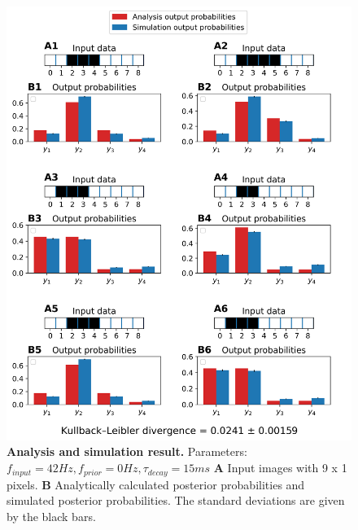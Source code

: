 \begin{figure}
  \includegraphics[width=\linewidth]{figures/1D/1D_42_0_15.png}
  \caption{\textbf{Analysis and simulation result. } Parameters: $f_{input} = 42 Hz, f_{prior} = 0 Hz, \tau_{decay} = 15 ms$ \textbf{A} Input images with 9 x 1 pixels. \textbf{B} Analytically calculated posterior probabilities and simulated posterior probabilities. The standard deviations are given by the black bars.}
  \label{fig:1D_42_0_15}
\end{figure}

